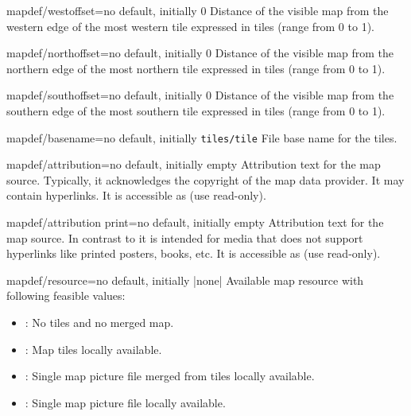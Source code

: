 \begin{docMrcKey}{mapdef/westoffset}{=}{no default, initially 0}
  Distance of the visible map from the western edge of the most western tile
  expressed in tiles (range from 0 to 1).
\end{docMrcKey}

\begin{docMrcKey}{mapdef/northoffset}{=}{no default, initially 0}
  Distance of the visible map from the northern edge of the most northern tile
  expressed in tiles (range from 0 to 1).
\end{docMrcKey}

\begin{docMrcKey}{mapdef/southoffset}{=}{no default, initially 0}
  Distance of the visible map from the southern edge of the most southern tile
  expressed in tiles (range from 0 to 1).
\end{docMrcKey}

\begin{docMrcKey}{mapdef/basename}{=}{no default, initially \texttt{tiles/tile}}
  File base name for the tiles.
\end{docMrcKey}

\begin{docMrcKey}{mapdef/attribution}{=}{no default, initially empty}
  Attribution text for the map source. Typically, it acknowledges the copyright
  of the map data provider. It may contain hyperlinks.
  It is accessible as  (use read-only).
\end{docMrcKey}

\begin{docMrcKey}{mapdef/attribution print}{=}{no default, initially empty}
  Attribution text for the map source.
  In contrast to  it is intended for media
  that does not support hyperlinks like printed posters, books, etc.
  It is accessible as  (use read-only).
\end{docMrcKey}


\begin{docMrcKey}{mapdef/resource}{=}{no default, initially |none|}
  Available map resource with following feasible values:
  \begin{itemize}
  \item{}: No tiles and no merged map.
  \item{}: Map tiles locally available.
  \item{}: Single map picture file merged from tiles locally available.
  \item{}: Single map picture file locally available.
  \end{itemize}
\end{docMrcKey}

